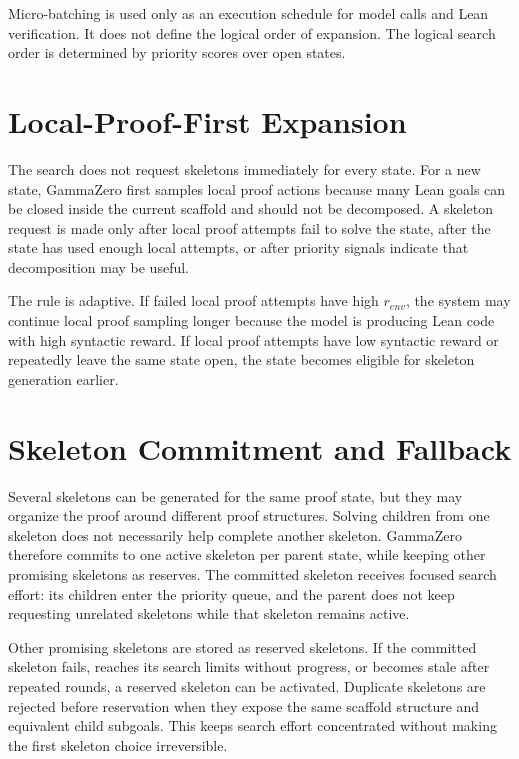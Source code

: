 Micro-batching is used only as an execution schedule for model calls and Lean verification. It does not define the logical order of expansion. The logical search order is determined by priority scores over open states.

\section{Local-Proof-First Expansion}

The search does not request skeletons immediately for every state. For a new state, GammaZero first samples local proof actions because many Lean goals can be closed inside the current scaffold and should not be decomposed. A skeleton request is made only after local proof attempts fail to solve the state, after the state has used enough local attempts, or after priority signals indicate that decomposition may be useful.

The rule is adaptive. If failed local proof attempts have high \(r_{env}\), the system may continue local proof sampling longer because the model is producing Lean code with high syntactic reward. If local proof attempts have low syntactic reward or repeatedly leave the same state open, the state becomes eligible for skeleton generation earlier.

\section{Skeleton Commitment and Fallback}

Several skeletons can be generated for the same proof state, but they may organize the proof around different proof structures. Solving children from one skeleton does not necessarily help complete another skeleton. GammaZero therefore commits to one active skeleton per parent state, while keeping other promising skeletons as reserves. The committed skeleton receives focused search effort: its children enter the priority queue, and the parent does not keep requesting unrelated skeletons while that skeleton remains active.

Other promising skeletons are stored as reserved skeletons. If the committed skeleton fails, reaches its search limits without progress, or becomes stale after repeated rounds, a reserved skeleton can be activated. Duplicate skeletons are rejected before reservation when they expose the same scaffold structure and equivalent child subgoals. This keeps search effort concentrated without making the first skeleton choice irreversible.


